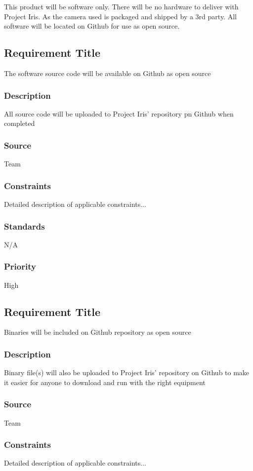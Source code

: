 This product will be software only. There will be no hardware to deliver with Project Iris. As the camera used is packaged and shipped by a 3rd party. All software will be located on Github for use as open source.

\subsection{Requirement Title}
The software source code will be available on Github as open source
\subsubsection{Description}
All source code will be uploaded to Project Iris' repository pn Github when completed
\subsubsection{Source}
Team
\subsubsection{Constraints}
Detailed description of applicable constraints...
\subsubsection{Standards}
N/A
\subsubsection{Priority}
High

\subsection{Requirement Title}
Binaries will be included on Github repository as open source
\subsubsection{Description}
Binary file(s) will also be uploaded to Project Iris' repository on Github to make it easier for anyone to download and run with the right equipment
\subsubsection{Source}
Team
\subsubsection{Constraints}
Detailed description of applicable constraints...
